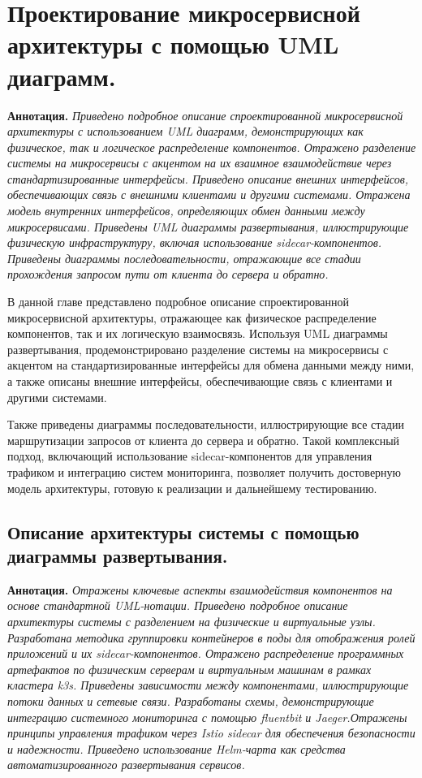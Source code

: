 \chapter{Проектирование микросервисной архитектуры с помощью UML диаграмм. }
\textbf{Аннотация.} \textit{Приведено подробное описание спроектированной микросервисной архитектуры с использованием UML диаграмм, демонстрирующих как физическое, так и логическое распределение компонентов. Отражено разделение системы на микросервисы с акцентом на их взаимное взаимодействие через стандартизированные интерфейсы. Приведено описание внешних интерфейсов, обеспечивающих связь с внешними клиентами и другими системами. Отражена модель внутренних интерфейсов, определяющих обмен данными между микросервисами. Приведены UML диаграммы развертывания, иллюстрирующие физическую инфраструктуру, включая использование sidecar-компонентов. Приведены диаграммы последовательности, отражающие все стадии прохождения запросом пути от клиента до сервера и обратно.}

В данной главе представлено подробное описание спроектированной микросервисной архитектуры, отражающее как физическое распределение компонентов, так и их логическую взаимосвязь. Используя UML диаграммы развертывания, продемонстрировано разделение системы на микросервисы с акцентом на стандартизированные интерфейсы для обмена данными между ними, а также описаны внешние интерфейсы, обеспечивающие связь с клиентами и другими системами.

Также приведены диаграммы последовательности, иллюстрирующие все стадии маршрутизации запросов от клиента до сервера и обратно. Такой комплексный подход, включающий использование sidecar-компонентов для управления трафиком и интеграцию систем мониторинга, позволяет получить достоверную модель архитектуры, готовую к реализации и дальнейшему тестированию.


\section{Описание архитектуры системы с помощью диаграммы развертывания.}
\textbf{Аннотация.} \textit{Отражены ключевые аспекты взаимодействия компонентов на основе стандартной UML-нотации. Приведено подробное описание архитектуры системы с разделением на физические и виртуальные узлы. Разработана методика группировки контейнеров в поды для отображения ролей приложений и их sidecar-компонентов. Отражено распределение программных артефактов по физическим серверам и виртуальным машинам в рамках кластера k3s. Приведены зависимости между компонентами, иллюстрирующие потоки данных и сетевые связи. Разработаны схемы, демонстрирующие интеграцию системного мониторинга с помощью fluentbit и Jaeger.Отражены принципы управления трафиком через Istio sidecar для обеспечения безопасности и надежности. Приведено использование Helm-чарта как средства автоматизированного развертывания сервисов. }

